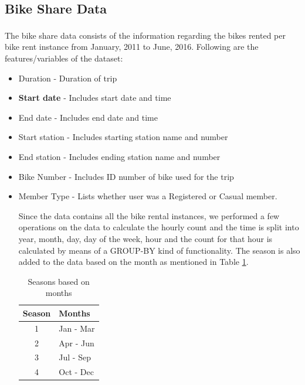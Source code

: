 \documentclass[journal, a4paper]{IEEEtran}
\begin{document}
\subsection{Bike Share Data}
\indent The bike share data\textsuperscript{\cite{bsdataset}} consists of the information regarding the bikes rented per bike rent instance from January, 2011 to June, 2016. Following are the features/variables of the dataset:
\begin{itemize}
\item Duration - Duration of trip
\item \textbf{Start date} - Includes start date and time
\item End date - Includes end date and time
\item Start station - Includes starting station name and number
\item End station - Includes ending station name and number
\item Bike Number - Includes ID number of bike used for the trip
\item Member Type - Lists whether user was a Registered or Casual member.

\indent Since the data contains all the bike rental instances, we performed a few operations on the data to calculate the hourly count and the time is split into year, month, day, day of the week, hour and the count for that hour is calculated by means of a GROUP-BY kind of functionality. The season is also added to the data based on the month as mentioned in Table \ref{seasons}.
\begin{center}
\begin{table}[ht!]
\centering
\begin{tabular}{||c l||} 
 \hline
 Season & Months\\ [0.5ex] 
 \hline\hline
 1 & Jan - Mar \\ 
 \hline
 2 & Apr - Jun \\
 \hline
 3 & Jul - Sep \\
 \hline
 4 & Oct - Dec \\ [1ex] 
 \hline
\end{tabular}
\caption{Seasons based on months}
 \label{seasons}
\end{table}
\end{center}
\end{itemize}
\end{document}
